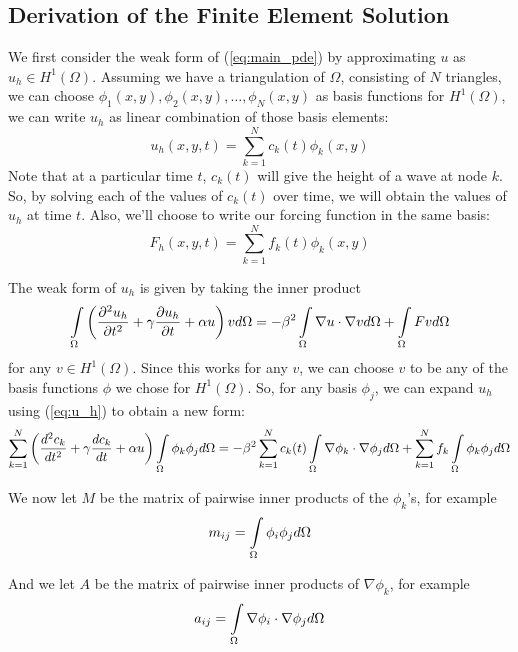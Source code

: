 \subsection{Derivation of the Finite Element Solution}
We first consider the weak form of (\ref{eq:main_pde}) by approximating $u$ as $u_h \in H^1(\Omega)$. Assuming we have
a triangulation of $\Omega$, consisting of $N$ triangles, we can choose 
$\phi_1(x,y), \phi_2(x,y), \ldots, \phi_N(x,y)$ as basis functions for $H^1(\Omega)$, we can write $u_h$ as linear
combination of those basis elements:
\begin{equation} \label{eq:u_h}
u_h(x,y,t) = \sum\limits_{k=1}^N c_k(t) \phi_k(x,y)
\end{equation}
Note that at a particular time $t$, $c_k(t)$ will give the height of a wave at node $k$. So, by solving each of the values
of $c_k(t)$ over time, we will obtain the values of $u_h$ at time $t$. Also, we'll choose to write our forcing function in
the same basis:
\begin{equation}
F_h(x,y,t) = \sum\limits_{k=1}^N f_k(t) \phi_k(x,y)
\end{equation}

The weak form of $u_h$ is given by taking the inner product 
\begin{equation} \label{eq:u_h_weak_form}
\int\limits_{\Omega}  \left( \frac{\partial^2 u_h}{\partial t^2} + \gamma \frac{\partial u_h}{\partial t} + \alpha u \right)   v  d\Omega
=
- \beta^2 \int\limits_{\Omega} \nabla u \cdot \nabla v d\Omega
+ \int\limits_{\Omega} F v d\Omega
\end{equation}
for any $v \in H^1(\Omega)$. Since this works for any $v$, we can choose $v$ to be any of the basis functions $\phi$
we chose for $H^1(\Omega)$. So, for any basis $\phi_j$, we can expand $u_h$ using (\ref{eq:u_h}) to obtain a new form:
\begin{equation} \label{eq:u_h_weak_form_expanded}
\sum\limits_{k=1}^N \left( \frac{d^2 c_k}{d t^2} + \gamma\frac{d c_k}{d t} + \alpha u \right) \int\limits_{\Omega} \phi_k \phi_j d\Omega
=
- \beta^2\sum\limits_{k=1}^N c_k(t) \int\limits_{\Omega} \nabla \phi_k \cdot \nabla \phi_j d\Omega
+
\sum\limits_{k=1}^N f_k \int\limits_{\Omega} \phi_k \phi_j d\Omega
\end{equation}

We now let $M$ be the matrix of pairwise inner products of the $\phi_k$'s, for example
\begin{equation} \label{eq:m_definition}
m_{ij} = \int\limits_{\Omega} \phi_i \phi_j d\Omega
\end{equation}

And we let $A$ be the matrix of pairwise inner products of $\nabla \phi_k$, for example
\begin{equation} \label{eq:a_definition}
a_{ij} = \int\limits_{\Omega} \nabla \phi_i \cdot \nabla \phi_j d\Omega
\end{equation}

